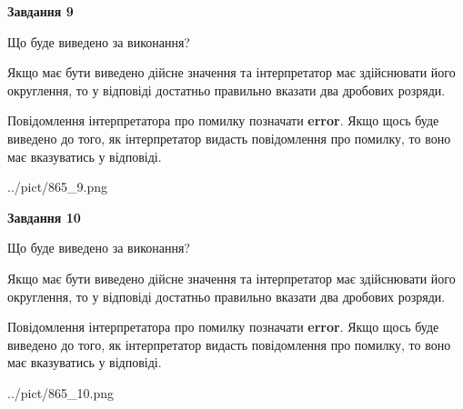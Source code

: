\documentclass[12pt, ukrainian]{article}
\begin{document}
{\begin {Large}
{\begin {center}\textbf{Завдання 9}\end {center}}\par
Що буде виведено за виконання? \par

Якщо має бути виведено дійсне значення та інтерпретатор має здійснювати його округлення, 
то у відповіді достатньо правильно вказати два дробових розряди.

Повідомлення інтерпретатора про помилку позначати \textbf{error}.
Якщо щось буде виведено до того, як інтерпретатор видасть повідомлення про помилку, 
то воно має вказуватись у відповіді. \par

\begin{center}
	{../pict/865_9.png}
\end{center}
\newpage

{\begin {center}\textbf{Завдання 10}\end {center}}\par
Що буде виведено за виконання? \par

Якщо має бути виведено дійсне значення та інтерпретатор має здійснювати його округлення, 
то у відповіді достатньо правильно вказати два дробових розряди.

Повідомлення інтерпретатора про помилку позначати \textbf{error}.
Якщо щось буде виведено до того, як інтерпретатор видасть повідомлення про помилку, 
то воно має вказуватись у відповіді. \par

\begin{center}
	{../pict/865_10.png}
\end{center}
\newpage

\end {Large}}
\end{document}
